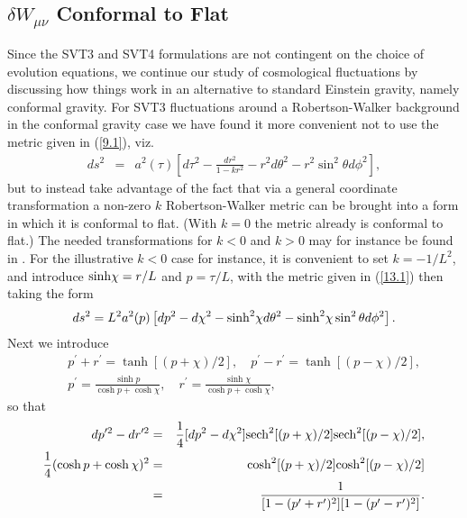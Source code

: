 \subsection{$\delta W_{\mu\nu}$ Conformal to Flat}
\label{ss:deltaW_conformal_flat_SVT3}

Since the SVT3 and SVT4 formulations are not contingent on the choice of evolution equations, we continue our study of cosmological fluctuations by discussing how things work in an alternative to standard Einstein gravity, namely conformal gravity.  For SVT3 fluctuations around a Robertson-Walker background in the conformal gravity case  we have found it more convenient not to use the metric given in (\ref{9.1}), viz.
% 
\begin{eqnarray}
ds^2&=&a^2(\tau)\left[d\tau^2-\frac{dr^2}{1-kr^2}-r^2d\theta^2-r^2\sin^2\theta d\phi^2\right],
\label{13.1}
\end{eqnarray}
% 
but to instead take advantage of the fact that via a general coordinate transformation a non-zero $k$ Robertson-Walker metric can be brought into a form in which it is conformal to flat. (With $k=0$ the metric already is conformal to flat.) The needed transformations for $k<0$ and $k>0$ may for instance be found in \cite{amarasinghe_2019}.  
For the illustrative $k<0$ case for instance, it is convenient to set $k=-1/L^2$, and introduce ${\rm sinh} \chi=r/L$ and $p=\tau/L$, with the  metric given in (\ref{13.1}) then taking the form
%
\begin{eqnarray}
ds^2=L^2a^2(p)\left[dp^2-d\chi^2 -{\rm sinh}^2\chi d\theta^2-{\rm sinh}^2\chi \sin^2\theta d\phi^2\right].
\label{13.2}
\end{eqnarray}
%
Next we introduce
%
\begin{eqnarray}
&&p^{\prime}+r^{\prime}=\tanh[(p+\chi)/2],\quad p^{\prime}-r^{\prime}=\tanh[(p-\chi)/2],
\nonumber\\
&& p^{\prime}=\frac{\sinh p}{\cosh p+\cosh \chi},\quad r^{\prime}=\frac{\sinh \chi}{\cosh p+\cosh \chi},
\label{13.3}
\end{eqnarray}
%
so that
%
\begin{eqnarray}
dp^{\prime 2}-dr^{\prime 2}&=&\frac{1}{4}[dp^2-d\chi^2]{\rm sech}^2[(p+\chi)/2]{\rm sech}^2[(p-\chi)/2],
\nonumber\\
\frac{1}{4}(\cosh p+\cosh \chi)^2&=&{\rm \cosh}^2[(p+\chi)/2]{\rm \cosh}^2[(p-\chi)/2]
\nonumber\\
&=&\frac{1}{[1-(p^{\prime}+r^{\prime})^2][1-(p^{\prime}-r^{\prime})^2]}.
\label{13.4}
\end{eqnarray}
